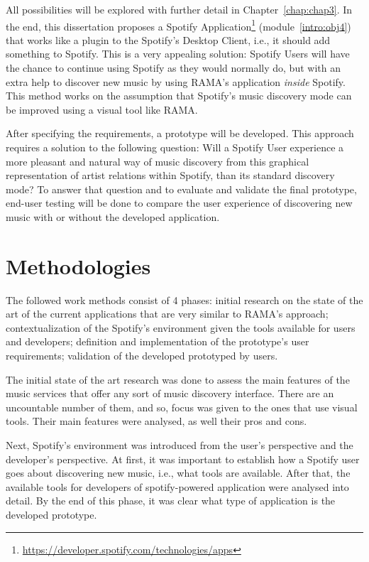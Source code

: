   All possibilities will be explored with further detail in Chapter~\ref{chap:chap3}.
  In the end, this dissertation proposes a Spotify Application\footnote{\url{https://developer.spotify.com/technologies/apps}} (module~\ref{intro:obj4}) that works like a plugin to the Spotify's Desktop Client, i.e., it should add something to Spotify.
  This is a very appealing solution: Spotify Users will have the chance to continue using Spotify as they would normally do, but with an extra help to discover new music by using RAMA's application \emph{inside} Spotify. 
  This method works on the assumption that Spotify's music discovery mode can be improved using a visual tool like RAMA.

  After specifying the requirements, a prototype will be developed.
  This approach requires a solution to the following question: Will a Spotify User experience a more pleasant and natural way of music discovery from this graphical representation of artist relations within Spotify, than its standard discovery mode?
  To answer that question and to evaluate and validate the final prototype, end-user testing will be done to compare the user experience of discovering new music with or without the developed application.

\section{Methodologies}
\label{sec:methodologies}

  The followed work methods consist of 4 phases: initial research on the state of the art of the current applications that are very similar to RAMA's approach; contextualization of the Spotify's environment given the tools available for users and developers; definition and implementation of the prototype's user requirements; validation of the developed prototyped by users.

  The initial state of the art research was done to assess the main features of the music services that offer any sort of music discovery interface.
  There are an uncountable number of them, and so, focus was given to the ones that use visual tools.
  Their main features were analysed, as well their pros and cons.

  Next, Spotify's environment was introduced from the user's perspective and the developer's perspective.
  At first, it was important to establish how a Spotify user goes about discovering new music, i.e., what tools are available.
  After that, the available tools for developers of spotify-powered application were analysed into detail.
  By the end of this phase, it was clear what type of application is the developed prototype.

